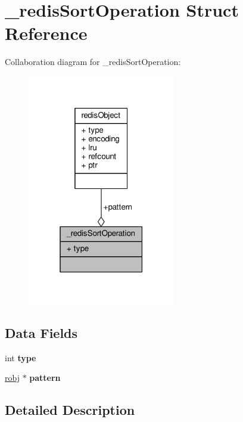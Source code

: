 \hypertarget{struct__redisSortOperation}{}\section{\+\_\+redis\+Sort\+Operation Struct Reference}
\label{struct__redisSortOperation}


Collaboration diagram for \+\_\+redis\+Sort\+Operation\+:\nopagebreak
\begin{figure}[H]
\begin{center}
\leavevmode
\includegraphics[width=183pt]{struct__redisSortOperation__coll__graph}
\end{center}
\end{figure}
\subsection*{Data Fields}
\begin{DoxyCompactItemize}
\item 
\mbox{\label{struct__redisSortOperation_aa15685700428f4fe6cb63518eb8c5adc}} 
int {\bfseries type}
\item 
\mbox{\label{struct__redisSortOperation_adf9bf02d385c5a695c4a2b93bd6a4b0f}} 
\hyperlink{structredisObject}{robj} $\ast$ {\bfseries pattern}
\end{DoxyCompactItemize}


\subsection{Detailed Description}


